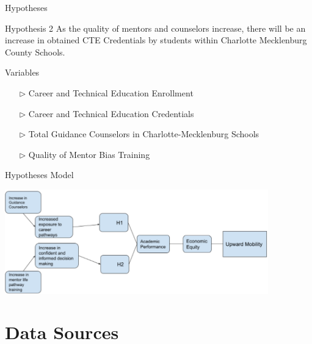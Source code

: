\documentclass[10pt]{beamer}
\begin{document}
\begin{frame}[fragile]{Hypotheses}
    \fontsize{11pt}{7.2}
    \begin{block}{Hypothesis 2}
        As the quality of mentors and counselors increase, there will be an increase in obtained CTE  Credentials by students within Charlotte Mecklenburg County Schools.
    \end{block}

    \pause 

    \vspace{1cm}

    \begin{exampleblock}{Variables}
        \begin{itemize}
            \item[$\triangleright$] Career and Technical Education Enrollment
            \item[$\triangleright$] Career and Technical Education Credentials
            \item[$\triangleright$] Total Guidance Counselors in Charlotte-Mecklenburg Schools
            \item[$\triangleright$] Quality of Mentor Bias Training
        \end{itemize}
    \end{exampleblock}

\end{frame}

\begin{frame}[fragile]{Hypotheses Model}

    \includegraphics[width=11.4cm]{Hypothesis_Modelv2.png}

\end{frame}


\section[Data Sources]{Data Sources}
\end{document}
